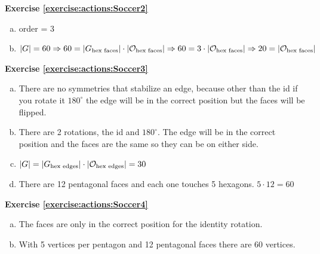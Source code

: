 \noindent\textbf{Exercise \ref{exercise:actions:Soccer2}}
\begin{enumerate}[(a)]
\item
order = 3

\item
$|G| = 60 \implies 60 = |G_{\text{hex faces}}| \cdot |{\cal O}_{\text{hex faces}}| \implies 60 = 3 \cdot |{\cal O}_{\text{hex faces}}| \implies 20 = |{\cal O}_{\text{hex faces}}|$
\end{enumerate}

\noindent\textbf{Exercise \ref{exercise:actions:Soccer3}}
\begin{enumerate}[(a)]
\item
There are no symmetries that stabilize an edge, because other than the id if you rotate it $180^{\circ}$ the edge will be in the correct position but the faces will be flipped.

\item
There are 2 rotations, the id and $180^{\circ}$.  The edge will be in the correct position and the faces are the same so they can be on either side.

\item
$|G| = |G_{\text{hex edges}}| \cdot |{\cal O}_{\text{hex edges}}| = 30$

\item
There are 12 pentagonal faces and each one touches 5 hexagons. $5 \cdot 12 = 60$
\end{enumerate}

\noindent\textbf{Exercise \ref{exercise:actions:Soccer4}}
\begin{enumerate}[(a)]
\item
The faces are only in the correct position for the identity rotation.

\item
With 5 vertices per pentagon and 12 pentagonal faces there are 60 vertices.
\end{enumerate}


